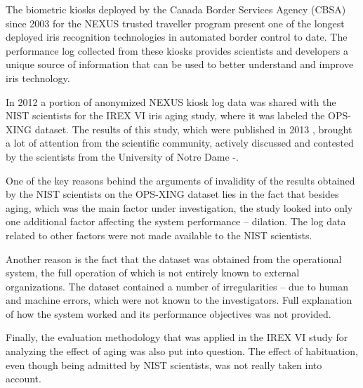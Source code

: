 \documentclass{cta-author}%
\begin{document}
The 
biometric kiosks deployed by the Canada Border Services Agency (CBSA) since 2003 for the NEXUS trusted traveller program  \cite{[CBSA-NEXUS]} present one of
the longest deployed iris recognition technologies in automated border control to date.
The performance log collected from these kiosks provides scientists and developers a unique source of information that can be used to better understand and improve iris technology.



In 2012 a portion  of anonymized NEXUS kiosk log data was shared with the NIST scientists for the IREX VI  iris aging study,  where it was labeled the OPS-XING dataset.   
The results of this study, which were published in 2013 \cite{irexVI}, brought a lot of attention from the scientific community,  
actively discussed and contested by the scientists from the University of Notre Dame \cite{IET0}-\cite{Bowyer-BTAS2016}.

One of the key reasons behind the arguments of invalidity of the results obtained by the NIST scientists on the OPS-XING dataset lies in the fact that 
besides aging, which was the main factor under investigation,  the study looked  into only one additional factor affecting the system performance -- dilation. The  log data related to other factors were not made available to the NIST scientists. %
 
Another reason is the fact that the dataset was obtained from the operational system, the full operation of which 
is not entirely known to external organizations.
The dataset contained a number of irregularities -- due to human and machine errors, which were not known to the investigators.
Full explanation of how the system worked and its performance objectives
was not provided.

Finally, the evaluation methodology that was applied in the IREX VI study for analyzing the effect of aging 
was  also put into question. The effect of habituation, even though being admitted by NIST scientists, was not really taken into account. 
\end{document}
